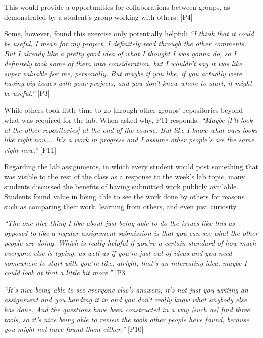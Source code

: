 This would provide a opportunities for collaborations between groups, as demonstrated by a student's group working with others:
 [P4]

Some, however, found this exercise only potentially helpful:
\textit{``I think that it could be useful, I mean for my project, I definitely read through the other comments. But I already like a pretty good idea of what I thought I was gonna do, so I definitely took some of them into consideration, but I wouldn't say it was like super valuable for me, personally. But maybe if you like, if you actually were having big issues with your projects, and you don't know where to start, it might be useful.''} [P3]

While others took little time to go through other groups' repositories beyond what was required for the lab. When asked why, P11 responds: \textit{``Maybe [I'll look at the other repositories] at the end of the course. But like I know what ours looks like right now... It's a work in progress and I assume other people's are the same right now.''} [P11]

Regarding the lab assignments, in which every student would post something that was visible to the rest of the class as a response to the week's lab topic, many students discussed the benefits of having submitted work publicly available. Students found value in being able to see the work done by others for reasons such as comparing their work, learning from others, and even just curiosity.

\textit{``The one nice thing I like about just being able to do the issues like this as opposed to like a regular assignment submission is that you can see what the other people are doing. Which is really helpful if you're a certain standard of how much everyone else is typing, as well as if you're just out of ideas and you need somewhere to start with you're like, alright, that's an interesting idea, maybe I could look at that a little bit more.''} [P3]

\textit{``It's nice being able to see everyone else's answers, it's not just you writing an assignment and you handing it in and you don't really know what anybody else has done. And the questions have been constructed in a way [such as] \'find three tools\', so it's nice being able to review the tools other people have found, because you might not have found them either.''} [P10]

